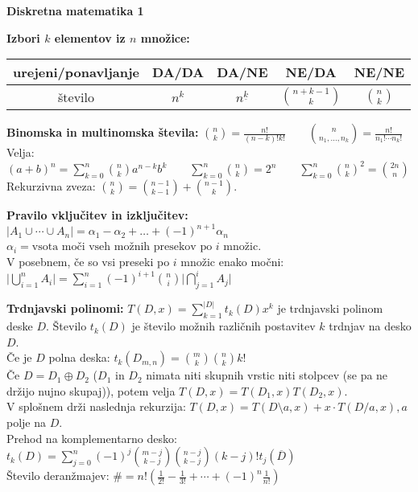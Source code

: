 \documentclass[a4paper, oneside, 10pt]{article}
\title{\mytitle}
\author{Jure Slak}
\date{\today}
\theoremstyle{definition}
\begin{document}
\pagestyle{empty}

\begin{center}
  \bf \Large Diskretna matematika 1
\end{center}

\textbf{Izbori $k$ elementov iz $n$ množice:} \\[6pt]
\begin{tabular}[h]{|c|c|c|c|c|}
  \hline
  urejeni/ponavljanje & DA/DA & DA/NE & NE/DA & NE/NE \\ \hline
  število & $n^k$ & $n^{\underline{k}}$ & $\binom{n+k-1}{k}$ & $\binom{n}{k}$ \\ \hline
\end{tabular}

\textbf{Binomska in multinomska števila:} $\binom{n}{k} = \frac{n!}{(n-k)!k!} \qquad \binom{n}{n_1, \ldots, n_k} =
\frac{n!}{n_1!\cdots n_k!}$ \\
Velja: $(a+b)^n = \sum_{k=0}^n\binom{n}{k}a^{n-k}b^k \qquad \sum_{k=0}^n\binom{n}{k} =
2^n \qquad \sum_{k=0}^n\binom{n}{k}^2 = \binom{2n}{n}$ \\
Rekurzivna zveza: $\binom{n}{k} = \binom{n-1}{k-1} + \binom{n-1}{k}$.

\textbf{Pravilo vključitev in izključitev:} $|A_1 \cup \cdots \cup A_n| = \alpha_1 - \alpha_2 + \dots +
(-1)^{n+1}\alpha_n$ \\
$\alpha_i = \text{vsota moči vseh možnih presekov po $i$ množic}$. \\
V posebnem, če so vsi preseki po $i$ množic enako močni:
$\lvert\bigcup_{i=1}^nA_i\rvert = \sum_{i=1}^n (-1)^{i+1}\binom{n}{i}\lvert\bigcap_{j=1}^iA_j\rvert$

\textbf{Trdnjavski polinomi:}
$T(D, x) = \sum_{k=1}^{|D|}t_k(D)x^k$ je trdnjavski polinom deske $D$. Število $t_k(D)$ je
število možnih različnih postavitev $k$ trdnjav na desko $D$.\\
Če je $D$ polna deska: $t_k(D_{m, n}) = \binom{m}{k}\binom{n}{k}k!$ \\
Če $D=D_1\oplus D_2$ ($D_1$ in $D_2$ nimata niti skupnih vrstic niti stolpcev (se pa ne
držijo nujno skupaj)), potem velja $T(D, x) = T(D_1, x)T(D_2, x)$. \\
V splošnem drži naslednja rekurzija: $T(D, x) = T(D\!\setminus\! a, x) + x\cdot T(D/a, x), a$
polje na $D$. \\
Prehod na komplementarno desko: $t_k(D) =
\sum_{j=0}^n(-1)^j\binom{m-j}{k-j}\binom{n-j}{k-j}(k-j)!t_j(\overline{D})$ \\
Število deranžmajev: $\# = n!(\frac{1}{2!} - \frac{1}{3!} + \cdots + (-1)^n\frac{1}{n!})$
\end{document}
